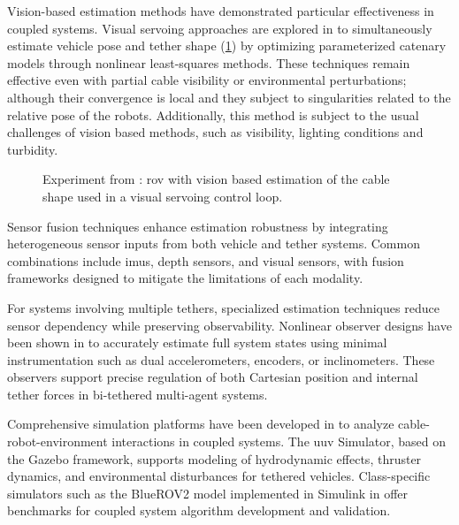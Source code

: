 Vision-based estimation methods have demonstrated particular effectiveness in coupled systems.
Visual servoing approaches are explored in \cite{laranjeiraCatenarybasedVisualServoing2020} to
simultaneously estimate vehicle pose and tether shape
(\cref{sota_sm_cm_visual_servoing_experiment}) by optimizing parameterized catenary models through
nonlinear least-squares methods. These techniques remain effective even with partial cable
visibility or environmental perturbations; although their convergence is local and they subject to
singularities related to the relative pose of the robots. Additionally, this method is subject to
the usual challenges of vision based methods, such as visibility, lighting conditions and
turbidity.

\begin{figure}
	\centering
	\caption{
		Experiment from \cite{laranjeiraCatenarybasedVisualServoing2020}: \ac{rov} with vision based
		estimation of the cable shape used in a visual servoing control loop.
	}
	\label{sota_sm_cm_visual_servoing_experiment}
\end{figure}

Sensor fusion techniques enhance estimation robustness by integrating heterogeneous sensor inputs
from both vehicle and tether systems. Common combinations include \acp{imu}, depth sensors, and
visual sensors, with fusion frameworks designed to mitigate the limitations of each modality.

For systems involving multiple tethers, specialized estimation techniques reduce sensor dependency
while preserving observability. Nonlinear observer designs have been shown in
\cite{tognonNonlinearObserverControl2015} to accurately estimate full system states using minimal
instrumentation such as dual accelerometers, encoders, or inclinometers. These observers support
precise regulation of both Cartesian position and internal tether forces in bi-tethered multi-agent
systems.

Comprehensive simulation platforms have been developed in \cite{manhaesUUVSimulatorGazebobased2016}
to analyze cable-robot-environment interactions in coupled systems. The \ac{uuv} Simulator, based
on the Gazebo framework, supports modeling of hydrodynamic effects, thruster dynamics, and
environmental disturbances for tethered vehicles. Class-specific simulators such as the BlueROV2
model implemented in Simulink in \cite{vonbenzonOpenSourceBenchmarkSimulator2022} offer benchmarks
for coupled system algorithm development and validation.

